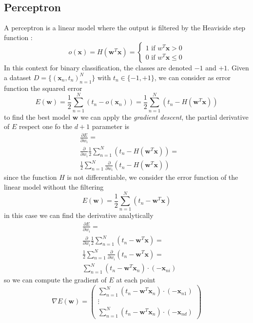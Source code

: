 \documentclass[10pt, letterpaper]{report}
\begin{document}
\subsection{Perceptron}
A perceptron is a linear model where the output is filtered by the Heaviside step function :\begin{equation}
    o(\mathbf x)=H(\mathbf w^T\mathbf x)=\begin{cases}
        1 \text{ if }w^T\mathbf x>0\\ 
        0 \text{ if }w^T\mathbf x\le 0
    \end{cases}
\end{equation}
In this context for binary classification, the classes are denoted $-1$ and $+1$.
Given a dataset $D=\{(\mathbf x_n,t_n)_{n=1}^N\}$ with $t_n\in\{-1,+1\}$, we can consider as error function the squared error\begin{equation}
    E(\mathbf w)=\frac{1}{2}\sum_{n=1}^N(t_n-o(\mathbf x_n))=\frac{1}{2}\sum_{n=1}^N(t_n-H(\mathbf w^T\mathbf x))
\end{equation}
to find the best model $\mathbf w$ we can apply the \textit{gradient descent}, the partial derivative of $E$ respect one fo the $d+1$ parameter is\begin{align}
    &\frac{\partial E}{\partial w_i}=\\&\frac{\partial}{\partial w_i}\frac{1}{2}\sum_{n=1}^N(t_n-H(\mathbf w^T\mathbf x))=\\
    &\frac{1}{2}\sum_{n=1}^N\frac{\partial}{\partial w_i}(t_n-H(\mathbf w^T\mathbf x))
\end{align}
since the function $H$ is not differentiable, we consider the error function of the linear model without the filtering\begin{equation}
    E(\mathbf w)=\frac{1}{2}\sum_{n=1}^N(t_n-\mathbf w^T\mathbf x)
\end{equation}
in this case we can find the derivative analytically\begin{align}
    &\frac{\partial E}{\partial w_i}=\\&\frac{\partial}{\partial w_i}\frac{1}{2}\sum_{n=1}^N(t_n-\mathbf w^T\mathbf x)=\\
    &\frac{1}{2}\sum_{n=1}^N\frac{\partial}{\partial w_i}(t_n-\mathbf w^T\mathbf x)=\\
    &\sum_{n=1}^N(t_n-\mathbf w^T\mathbf x_n)\cdot (-\mathbf x_{ni})
\end{align}
so we can compute the gradient of $E$ at each point\begin{equation}
    \nabla E(\mathbf w)=\begin{pmatrix}
        \sum_{n=1}^N(t_n-\mathbf w^T\mathbf x_n)\cdot (-\mathbf x_{n1})\\ 
        \vdots \\ 
        \sum_{n=1}^N(t_n-\mathbf w^T\mathbf x_n)\cdot (-\mathbf x_{nd})
    \end{pmatrix}
\end{equation}
\end{document}
